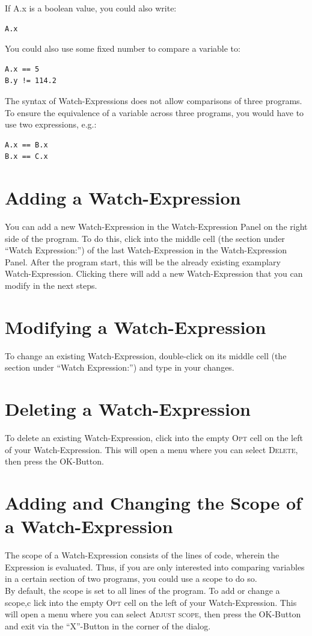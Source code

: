 \documentclass[parskip=full]{memoir}
\begin{document}
If A.x is a boolean value, you could also write:
\begin{verbatim}
A.x
\end{verbatim}

You could also use some fixed number to compare a variable to:
\begin{verbatim}
A.x == 5
B.y != 114.2
\end{verbatim}

The syntax of Watch-Expressions does not allow comparisons of three programs. To ensure the equivalence of a variable across three programs, you would have to use two expressions, e.g.:
\begin{verbatim}
A.x == B.x
B.x == C.x
\end{verbatim}


\section{Adding a Watch-Expression}\label{adding}
You can add a new Watch-Expression in the Watch-Expression Panel on the right side of the program. To do this, click into the middle cell (the section under \enquote{Watch Expression:}) of the last Watch-Expression in the Watch-Expression Panel. After the program start, this will be the already existing examplary Watch-Expression. Clicking there will add a new Watch-Expression that you can modify in the next steps.

\section{Modifying a Watch-Expression}\label{modifying}
To change an existing Watch-Expression, double-click on its middle cell (the section under \enquote{Watch Expression:}) and type in your changes.

\section{Deleting a Watch-Expression}\label{deleting}
To delete an existing Watch-Expression, click into the empty \textsc{Opt} cell on the left of your Watch-Expression. This will open a menu where you can select \textsc{Delete}, then press the \textsc{OK}-Button.

\section{Adding and Changing the Scope of a Watch-Expression}\label{scope}
The scope of a Watch-Expression consists of the lines of code, wherein the Expression is evaluated. Thus, if you are only interested into comparing variables in a certain section of two programs, you could use a scope to do so. \\
By default, the scope is set to all lines of the program.
To add or change a scope,c lick into the empty \textsc{Opt} cell on the left of your Watch-Expression. This will open a menu where you can select \textsc{Adjust scope}, then press the \textsc{OK}-Button and exit via the \enquote{X}-Button in the corner of the dialog.
\end{document}
